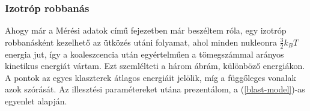 \documentclass[a4paper,12pt]{article}
\begin{document}
\vspace{5mm}

\subsubsection{ Izotróp robbanás}

\vspace{5mm}

\par Ahogy már a Mérési adatok című fejezetben már beszéltem róla, egy izotróp robbanásként kezelhető az ütközés utáni folyamat, ahol minden nukleonra $\frac{3}{2}k_{B}T$ energia jut, így a koaleszcencia után egyértelműen a tömegszámmal arányos kinetikus energiát vártam. Ezt szemlélteti a három ábrám, különböző energiákon. A pontok az egyes klaszterek átlagos energiáit jelölik, míg a függőleges vonalak azok szórását. Az illesztési paramétereket utána prezentálom, a (\ref{blast-model})-as egyenlet alapján.

\vspace{5mm}
\end{document}
